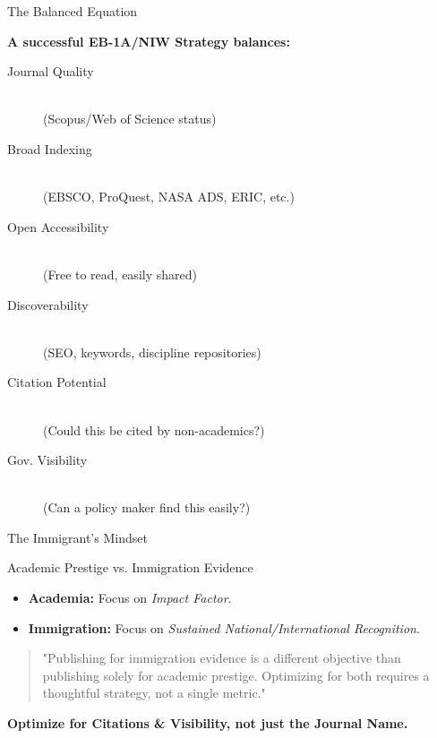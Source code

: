 \documentclass[10pt, aspectratio=169]{beamer}
\begin{document}
	\begin{frame}{The Balanced Equation}
		\begin{center}
			\Large{\textbf{A successful EB-1A/NIW Strategy balances:}}
		\end{center}
		\vspace{0.5cm}
		\begin{description}
			\item[Journal Quality] \hfill \\ (Scopus/Web of Science status)
			\item[Broad Indexing] \hfill \\ (EBSCO, ProQuest, NASA ADS, ERIC, etc.)
			\item[Open Accessibility] \hfill \\ (Free to read, easily shared)
			\item[Discoverability] \hfill \\ (SEO, keywords, discipline repositories)
			\item[Citation Potential] \hfill \\ (Could this be cited by non-academics?)
			\item[Gov. Visibility] \hfill \\ (Can a policy maker find this easily?)
		\end{description}
	\end{frame}
	
	\begin{frame}{The Immigrant's Mindset}
		\begin{block}{Academic Prestige vs. Immigration Evidence}
			\begin{itemize}
				\item \textbf{Academia:} Focus on \textit{Impact Factor}.
				\item \textbf{Immigration:} Focus on \textit{Sustained National/International Recognition}.
			\end{itemize}
		\end{block}
		\vspace{0.5cm}
		\begin{quote}
			"Publishing for immigration evidence is a different objective than publishing solely for academic prestige. Optimizing for both requires a thoughtful strategy, not a single metric."
		\end{quote}
		\vspace{0.5cm}
		\begin{center}
			\textbf{Optimize for Citations \& Visibility, not just the Journal Name.}
		\end{center}
	\end{frame}
	
\end{document}
